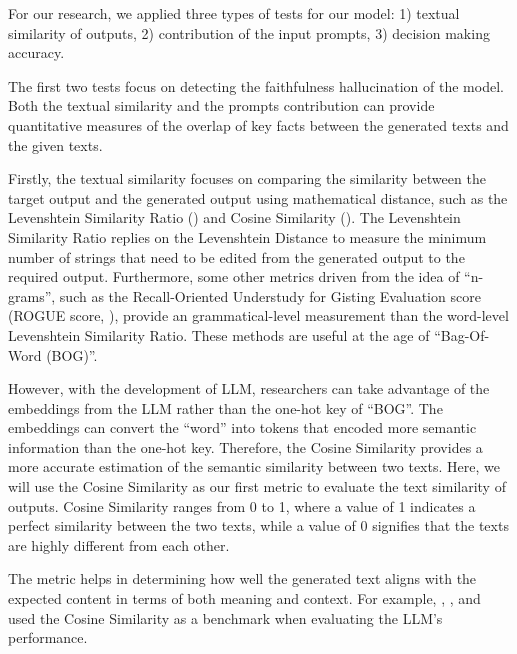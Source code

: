 For our research, we applied three types of tests for our model:  1) textual similarity of outputs, 2) contribution of the input prompts, 3) decision making accuracy. 

The first two tests focus on detecting the faithfulness hallucination of the model. Both the textual similarity and the prompts contribution can provide quantitative measures of the overlap of key facts between the generated texts and the given texts. 






Firstly, the textual similarity focuses on comparing the similarity between the target output and the generated output using mathematical distance, such as the Levenshtein Similarity Ratio (\cite{levenshtein1966binary}) and Cosine Similarity (\cite{tanguy2016natural}). The Levenshtein Similarity Ratio replies on the Levenshtein Distance to measure the minimum number of strings that need to be edited from the generated output to the required output. Furthermore, some other metrics driven from the idea of ``n-grams'', such as the Recall-Oriented Understudy for Gisting Evaluation score (ROGUE score, \cite{lin2004rouge}), provide an grammatical-level measurement than the word-level Levenshtein Similarity Ratio. These methods are useful at the age of ``Bag-Of-Word (BOG)''.




However, with the development of LLM, researchers can take advantage of the embeddings from the LLM rather than the one-hot key of ``BOG''. The embeddings can convert the ``word'' into tokens that encoded more semantic information than the one-hot key. Therefore, the Cosine Similarity provides a more accurate estimation of the semantic similarity between two texts. Here, we will use the Cosine Similarity as our first metric to evaluate the text similarity of outputs. Cosine Similarity ranges from 0 to 1, where a value of 1 indicates a perfect similarity between the two texts, while a value of 0 signifies that the texts are highly different from each other.

The metric helps in determining how well the generated text aligns with the expected content in terms of both meaning and context. For example, \cite{aynetdinov2024semscore}, \cite{kim2024comparison}, and \cite{yauney2023data} used the Cosine Similarity as a benchmark when evaluating the LLM's performance. 


